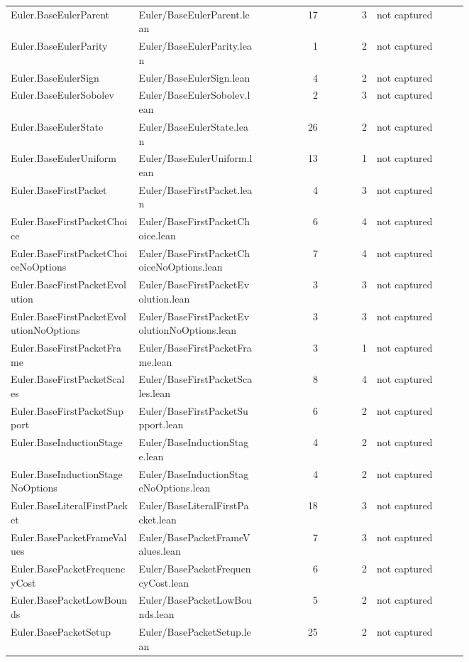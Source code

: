 \documentclass[10pt]{article}
\begin{document}
\begin{longtable}{p{0.28\linewidth}p{0.27\linewidth}r r p{0.20\linewidth}}
Euler.BaseEulerParent & Euler/BaseEulerParent.lean & 17 & 3 & not captured\\
Euler.BaseEulerParity & Euler/BaseEulerParity.lean & 1 & 2 & not captured\\
Euler.BaseEulerSign & Euler/BaseEulerSign.lean & 4 & 2 & not captured\\
Euler.BaseEulerSobolev & Euler/BaseEulerSobolev.lean & 2 & 3 & not captured\\
Euler.BaseEulerState & Euler/BaseEulerState.lean & 26 & 2 & not captured\\
Euler.BaseEulerUniform & Euler/BaseEulerUniform.lean & 13 & 1 & not captured\\
Euler.BaseFirstPacket & Euler/BaseFirstPacket.lean & 4 & 3 & not captured\\
Euler.BaseFirstPacketChoice & Euler/BaseFirstPacketChoice.lean & 6 & 4 & not captured\\
Euler.BaseFirstPacketChoiceNoOptions & Euler/BaseFirstPacketChoiceNoOptions.lean & 7 & 4 & not captured\\
Euler.BaseFirstPacketEvolution & Euler/BaseFirstPacketEvolution.lean & 3 & 3 & not captured\\
Euler.BaseFirstPacketEvolutionNoOptions & Euler/BaseFirstPacketEvolutionNoOptions.lean & 3 & 3 & not captured\\
Euler.BaseFirstPacketFrame & Euler/BaseFirstPacketFrame.lean & 3 & 1 & not captured\\
Euler.BaseFirstPacketScales & Euler/BaseFirstPacketScales.lean & 8 & 4 & not captured\\
Euler.BaseFirstPacketSupport & Euler/BaseFirstPacketSupport.lean & 6 & 2 & not captured\\
Euler.BaseInductionStage & Euler/BaseInductionStage.lean & 4 & 2 & not captured\\
Euler.BaseInductionStageNoOptions & Euler/BaseInductionStageNoOptions.lean & 4 & 2 & not captured\\
Euler.BaseLiteralFirstPacket & Euler/BaseLiteralFirstPacket.lean & 18 & 3 & not captured\\
Euler.BasePacketFrameValues & Euler/BasePacketFrameValues.lean & 7 & 3 & not captured\\
Euler.BasePacketFrequencyCost & Euler/BasePacketFrequencyCost.lean & 6 & 2 & not captured\\
Euler.BasePacketLowBounds & Euler/BasePacketLowBounds.lean & 5 & 2 & not captured\\
Euler.BasePacketSetup & Euler/BasePacketSetup.lean & 25 & 2 & not captured\\

\end{longtable}
\end{document}
